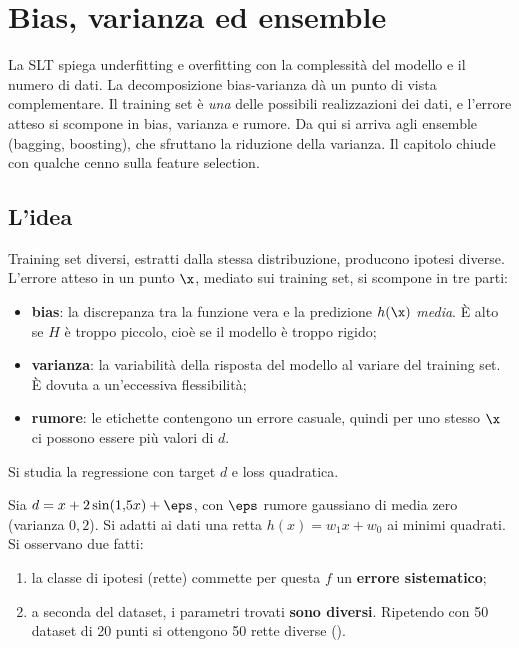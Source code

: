 \chapter{Bias, varianza ed ensemble}
\label{cap:biasvar}

\begin{inbreve}
La SLT spiega underfitting e overfitting con la complessità del modello e il numero di dati. La decomposizione
bias-varianza dà un punto di vista complementare. Il training set è \emph{una} delle possibili realizzazioni dei
dati, e l'errore atteso si scompone in bias, varianza e rumore. Da qui si arriva agli ensemble (bagging,
boosting), che sfruttano la riduzione della varianza. Il capitolo chiude con qualche cenno sulla feature
selection.
\end{inbreve}

\section{L'idea}

Training set diversi, estratti dalla stessa distribuzione, producono ipotesi diverse. L'errore atteso in un
punto $\x$, mediato sui training set, si scompone in tre parti:
\begin{itemize}
  \item \textbf{bias}: la discrepanza tra la funzione vera e la predizione $h(\x)$ \emph{media}. È alto se $H$ è
        troppo piccolo, cioè se il modello è troppo rigido;
  \item \textbf{varianza}: la variabilità della risposta del modello al variare del training set. È dovuta a
        un'eccessiva flessibilità;
  \item \textbf{rumore}: le etichette contengono un errore casuale, quindi per uno stesso $\x$ ci possono essere
        più valori di $d$.
\end{itemize}
Si studia la regressione con target $d$ e loss quadratica.

\begin{esempio}
Sia $d = x + 2\sin(1{,}5x) + \eps$, con $\eps$ rumore gaussiano di media zero (varianza $0{,}2$). Si adatti ai
dati una retta $h(x) = w_1x+w_0$ ai minimi quadrati. Si osservano due fatti:
\begin{enumerate}
  \item la classe di ipotesi (rette) commette per questa $f$ un \textbf{errore sistematico};
  \item a seconda del dataset, i parametri trovati \textbf{sono diversi}. Ripetendo con 50 dataset di 20 punti si
        ottengono 50 rette diverse ().
\end{enumerate}
\end{esempio}

